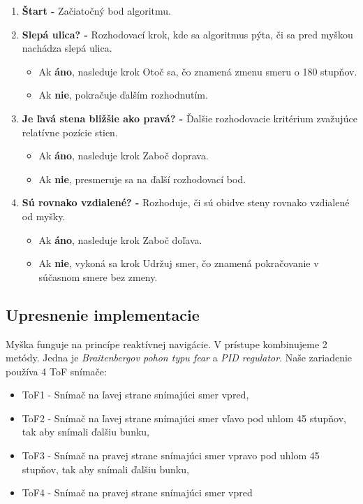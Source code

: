 \begin{enumerate}
	\item \textbf{Štart - }Začiatočný bod algoritmu.
	\item \textbf{Slepá ulica? - }Rozhodovací krok, kde sa algoritmus pýta, či sa pred myškou nachádza slepá ulica.
		\begin{itemize}
			\item Ak \textbf{áno}, nasleduje krok Otoč sa, čo znamená zmenu smeru o 180 stupňov.
			\item Ak \textbf{nie}, pokračuje ďalším rozhodnutím.
		\end{itemize}
	\item \textbf{Je ľavá stena bližšie ako pravá? - }Ďalšie rozhodovacie kritérium zvažujúce relatívne pozície stien.
		\begin{itemize}
			\item Ak \textbf{áno}, nasleduje krok Zaboč doprava.
			\item Ak \textbf{nie}, presmeruje sa na ďalší rozhodovací bod.
		\end{itemize}
	\item \textbf{Sú rovnako vzdialené? - }Rozhoduje, či sú obidve steny rovnako vzdialené od myšky.
		\begin{itemize}
			\item Ak \textbf{áno}, nasleduje krok Zaboč doľava.
			\item Ak \textbf{nie}, vykoná sa krok Udržuj smer, čo znamená pokračovanie v súčasnom smere bez zmeny.
		\end{itemize}
\end{enumerate}
\subsection{Upresnenie implementacie}
\label{subsec:upresnennie_implementacie}

Myška funguje na princípe reaktívnej navigácie. V prístupe kombinujeme 2 metódy. Jedna je \textit{Braitenbergov pohon
typu fear} a
\textit{PID regulator}. Naše zariadenie používa 4 ToF snímače:
\begin{itemize}
	\item ToF1 - Snímač na ľavej strane snímajúci smer vpred,
	\item ToF2 - Snímač na ľavej strane snímajúci smer vľavo pod uhlom 45 stupňov, tak aby snímali ďalšiu bunku,
	\item ToF3 - Snímač na pravej strane snímajúci smer vpravo pod uhlom 45 stupňov, tak aby snímali ďalšiu bunku,
	\item ToF4 - Snímač na pravej strane snímajúci smer vpred
\end{itemize}


